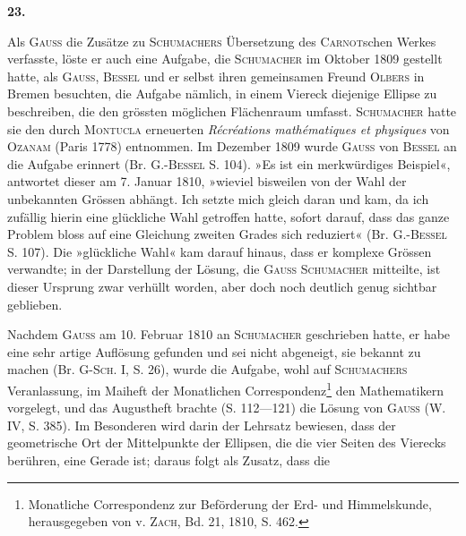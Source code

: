\clearpage\begingroup{}
\renewcommand{\thefootnote}{\arabic{footnote})}\setcounter{footnote}{0}
\begin{center}
\textbf{23.}\par\smallskip
{}
\end{center}
\noindent\hspace*{\parindent}Als \textsc{Gauss} die Zusätze zu \textsc{Schumachers} Übersetzung des \textsc{Carnot}schen
Werkes verfasste, löste er auch eine Aufgabe, die \textsc{Schumacher} im Oktober
1809 gestellt hatte, als \textsc{Gauss}, \textsc{Bessel} und er selbst ihren gemeinsamen Freund
\textsc{Olbers} in Bremen besuchten, die Aufgabe nämlich, in einem Viereck diejenige
Ellipse zu beschreiben, die den grössten möglichen Flächenraum umfasst.
\textsc{Schumacher} hatte sie den durch \textsc{Montucla} erneuerten \textit{Récréations mathématiques
et physiques} von \textsc{Ozanam} (Paris 1778) entnommen. Im Dezember 1809 wurde
\textsc{Gauss} von \textsc{Bessel} an die Aufgabe erinnert (Br. G.-\textsc{Bessel} S. 104). »Es ist
ein merkwürdiges Beispiel«, antwortet dieser am 7. Januar 1810, »wieviel bisweilen
von der Wahl der unbekannten Grössen abhängt. Ich setzte mich
gleich daran und kam, da ich zufällig hierin eine glückliche Wahl getroffen
hatte, sofort darauf, dass das ganze Problem bloss auf eine Gleichung zweiten
Grades sich reduziert« (Br. G.-\textsc{Bessel} S. 107). Die »glückliche Wahl« kam
darauf hinaus, dass er komplexe Grössen verwandte; in der Darstellung der
Lösung, die \textsc{Gauss} \textsc{Schumacher} mitteilte, ist dieser Ursprung zwar verhüllt
worden, aber doch noch deutlich genug sichtbar geblieben.
\par
Nachdem \textsc{Gauss} am 10. Februar 1810 an \textsc{Schumacher} geschrieben hatte,
\clearpage{}
\noindent er habe eine sehr artige Auflösung gefunden und sei nicht abgeneigt, sie bekannt
zu machen (Br. G-\textsc{Sch.} I, S. 26), wurde die Aufgabe, wohl auf \textsc{Schumachers}
Veranlassung, im Maiheft der Monatlichen Correspondenz\footnote{Monatliche Correspondenz zur Beförderung der Erd- und Himmelskunde, herausgegeben von v. \textsc{Zach}, Bd. 21, 1810, S. 462.} den Mathematikern
vorgelegt, und das Augustheft brachte (S. 112—121) die Lösung von
\textsc{Gauss} (W. IV, S. 385). Im Besonderen wird darin der Lehrsatz bewiesen,
dass der geometrische Ort der Mittelpunkte der Ellipsen, die die vier Seiten
des Vierecks berühren, eine Gerade ist; daraus folgt als Zusatz, dass die
